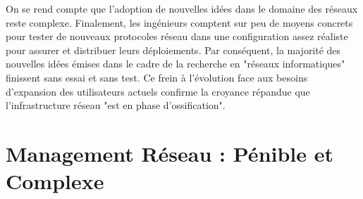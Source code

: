 
On se rend compte que l'adoption de nouvelles idées dans le domaine des réseaux reste complexe.  Finalement, les ingénieurs comptent sur peu de moyens concrets pour tester de nouveaux protocoles réseau dans une configuration assez réaliste pour assurer et distribuer leurs déploiements. Par conséquent, la majorité des nouvelles idées émises dans le cadre de la recherche en "réseaux informatiques" finissent sans essai et sans test. Ce frein à l'évolution face aux besoins d'expansion des utilisateurs actuels confirme la croyance répandue que l'infrastructure réseau "est en phase d'ossification". \cite{OpenFlowStanfordOssification} 


\section{Management Réseau : Pénible et Complexe}







